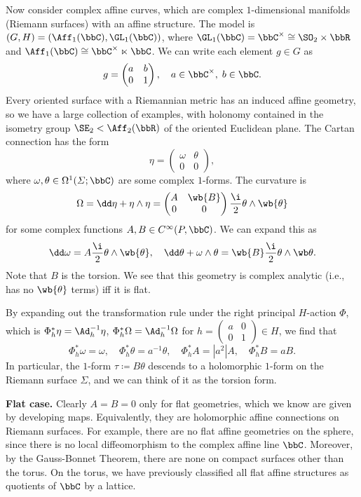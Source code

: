 Now consider complex affine curves, which are complex $1$-dimensional manifolds (Riemann surfaces) with an affine structure. The model is $(G,H)=(\Aff_1(\bbC),\GL_1(\bbC))$, where $\GL_1(\bbC)=\bbC^\times\cong \SO_2\times \bbR$ and $\Aff_1(\bbC)\cong \bbC^\times\ltimes\bbC$. We can write each element $g\in G$ as 
\[g=\begin{pmatrix}
    a & b\\ 0 & 1
\end{pmatrix},\quad a\in\bbC^\times,\; b\in\bbC.\]
Every oriented surface with a Riemannian metric has an induced affine geometry, so we have a large collection of examples, with holonomy contained in the isometry group $\SE_2<\Aff_2(\bbR)$ of the oriented Euclidean plane. The Cartan connection has the form 
\[\eta=\begin{pmatrix}
    \omega & \theta \\ 0 & 0
\end{pmatrix},\]
where $\omega,\theta\in\Omega^1(\varSigma;\bbC)$ are some complex $1$-forms. The curvature is 
\[\Omega=\dd\eta+\eta\wedge\eta=\begin{pmatrix}
    A & \wb{B} \\ 0 & 0
\end{pmatrix}\frac{\i}{2}\theta\wedge\wb{\theta}\]
for some complex functions $A,B\in C^\infty(P,\bbC)$. We can expand this as 
\[\dd\omega =A\frac{\i}{2}\theta\wedge\wb{\theta},\quad \dd\theta+\omega\wedge\theta=\wb{B}\frac{\i}{2}\theta\wedge\wb\theta.\]
Note that $B$ is the torsion. We see that this geometry is complex analytic (i.e., has no $\wb{\theta}$ terms) iff it is flat.

By expanding out the transformation rule under the right principal $H$-action $\Phi$, which is $\Phi_h^\ast \eta=\Ad_h^{-1}\eta$, $\Phi_h^\ast \Omega=\Ad_h^{-1}\Omega$ for $h=\left(\begin{smallmatrix}
    a & 0 \\ 0 & 1
\end{smallmatrix}\right)\in H$, we find that 
\[\Phi_h^\ast\omega=\omega,\quad \Phi_h^\ast\theta=a^{-1}\theta,\quad \Phi_h^\ast A=|a^2|A,\quad \Phi_h^\ast B=aB.\]
In particular, the $1$-form $\tau\coloneqq B\theta$ descends to a holomorphic $1$-form on the Riemann surface $\varSigma$, and we can think of it as the torsion form.

\textbf{Flat case.} Clearly $A=B=0$ only for flat geometries, which we know are given by developing maps. Equivalently, they are holomorphic affine connections on Riemann surfaces. For example, there are no flat affine geometries on the sphere, since there is no local diffeomorphism to the complex affine line $\bbC$. Moreover,  by the Gauss-Bonnet Theorem, there are none on compact surfaces other than the torus. On the torus, we have previously classified all flat affine structures as quotients of $\bbC$ by a lattice.

